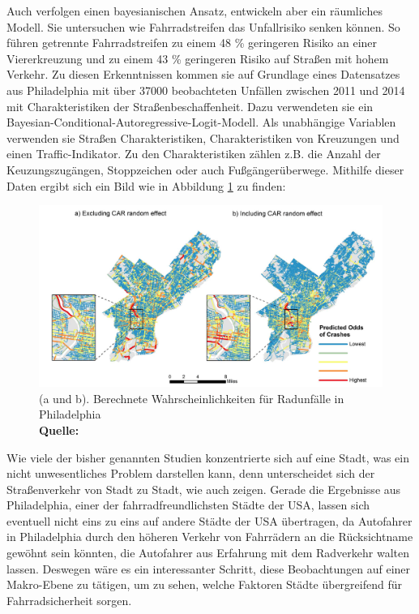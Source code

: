 \documentclass[a4paper,12pt]{thesis}
\newcommand*{\captionsource}[2]{%
	\caption[{#1}]{%
		#1%
		\\\hspace{\linewidth}%
		\textbf{Quelle:} #2%
	}%
}
\begin{document}
Auch \cite{Kondo2018} verfolgen einen bayesianischen Ansatz, entwickeln aber ein räumliches Modell. Sie untersuchen wie Fahrradstreifen das Unfallrisiko senken können. So führen getrennte Fahrradstreifen zu einem 48 \% geringeren Risiko an einer Viererkreuzung und zu einem 43 \% geringeren Risiko auf Straßen mit hohem Verkehr. Zu diesen Erkenntnissen kommen sie auf Grundlage eines Datensatzes aus Philadelphia mit über 37000 beobachteten Unfällen zwischen 2011 und 2014 mit Charakteristiken der Straßenbeschaffenheit. Dazu verwendeten sie ein Bayesian-Conditional-Autoregressive-Logit-Modell. Als unabhängige Variablen verwenden sie Straßen Charakteristiken, Charakteristiken von Kreuzungen und einen Traffic-Indikator. Zu den Charakteristiken zählen z.B. die Anzahl der Keuzungszugängen, Stoppzeichen oder auch Fußgängerüberwege. Mithilfe dieser Daten ergibt sich ein Bild wie in Abbildung \ref{kondor} zu finden:
\begin{figure}[!ht]
	\centering
	\includegraphics[width=\textwidth]{Plots/Kondor.png}
	\captionsource{(a und b). Berechnete Wahrscheinlichkeiten für Radunfälle in Philadelphia}{
		\cite{Kondo2018}
	}
	\label{kondor}
\end{figure}
Wie viele der bisher genannten Studien konzentrierte sich \cite{Kondo2018} auf eine Stadt, was ein nicht unwesentliches Problem darstellen kann, denn unterscheidet sich der Straßenverkehr von Stadt zu Stadt, wie auch \cite{Goldmann2021} zeigen. Gerade die Ergebnisse aus Philadelphia, einer der fahrradfreundlichsten Städte der USA, lassen sich eventuell nicht eins zu eins auf andere Städte der USA übertragen, da Autofahrer in Philadelphia durch den höheren Verkehr von Fahrrädern an die Rücksichtname gewöhnt sein könnten, die Autofahrer aus Erfahrung mit dem Radverkehr walten lassen. Deswegen wäre es ein interessanter Schritt, diese Beobachtungen auf einer Makro-Ebene zu tätigen, um zu sehen, welche Faktoren Städte übergreifend für Fahrradsicherheit sorgen.\\
\end{document}
